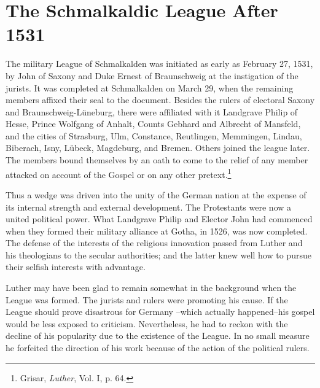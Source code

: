 \section{The Schmalkaldic League After 1531}

The military League of Schmalkalden was initiated as early as
February 27, 1531, by John of Saxony and Duke Ernest of Braunschweig at
the instigation of the jurists. It was completed at Schmalkalden on March
29, when the remaining members affixed their seal
to the document. Besides the rulers of electoral Saxony and Braunschweig-Lüneburg,
there were affiliated with it Landgrave Philip
of Hesse, Prince Wolfgang of Anhalt, Counts Gebhard and Albrecht
of Mansfeld, and the cities of Strasburg, Ulm, Constance, Reutlingen,
Memmingen, Lindau, Biberach, Isny, Lübeck, Magdeburg, and
Bremen. Others joined the league later. The members bound themselves by
an oath to come to the relief of any member attacked on
account of the Gospel or on any other pretext.\footnote{Grisar, \textit{Luther}, Vol. I, p. 64.}

Thus a wedge was driven into the unity of the German nation at
the expense of its internal strength and external development.
The Protestants were now a united political power. What Landgrave Philip
and Elector John had commenced when they formed
their military alliance at Gotha, in 1526, was now completed. The
defense of the interests of the religious innovation passed from Luther
and his theologians to the secular authorities; and the latter knew well
how to pursue their selfish interests with advantage.

Luther may have been glad to remain somewhat in the background when the
League was formed. The jurists and rulers were
promoting his cause. If the League should prove disastrous for Germany
--which actually happened--his gospel would be less exposed
to criticism. Nevertheless, he had to reckon with the decline of his
popularity due to the existence of the League. In no small measure he
forfeited the direction of his work because of the action of the political
rulers.

